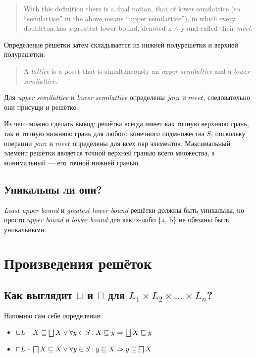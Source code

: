 \documentclass{report}
\begin{document}
\begin{quote}
    With this definition there is a dual notion, that of lower semilattice (so “semilattice” in the above means “upper semilattice”), in which every doubleton has a greatest lower bound, denoted x $\wedge$ y and called their \textit{meet}.
\end{quote}

Определение решётки затем складывается из нижней полурешётки и верхней полурешётки:

\begin{quote}
A \textit{lattice} is a poset that is simultaneously an \textit{upper semilattice} and a \textit{lower semilattice.}
\end{quote}

Для \textit{upper semilattice} и \textit{lower semilattice} определены \(join\) и \( meet\), следовательно они присущи и решётке.

Из чего можно сделать вывод: решётка всегда имеет как точную верхнюю грань, так и точную нижнюю грань для любого конечного подмножества $S$, поскольку операции \(join\) и \( meet\) определены для всех пар элементов. Максимальный элемент решётки является точной верхней гранью всего множества, а минимальный — его точной нижней гранью.

\subsection{Уникальны ли они?}

\textit{Least upper bound} и \textit{greatest lower bound} решётки должны быть уникальны, но просто \textit{upper bound} и \textit{lower bound} для каких-либо \{a, b\} не обязаны быть уникальными.

\section{Произведения решёток}

\subsection{Как выглядит $\sqcup$ и $\sqcap$ для $L_1 \times L_2 \times . . . \times L_n$?}

Напомню сам себе определения:
\begin{itemize}
    \item $\sqcup \space L$ -
        $X \sqsubseteq \bigsqcup X \space \vee \space \forall y \in S : X \sqsubseteq y \Rightarrow \bigsqcup X \sqsubseteq y$

    \item $\sqcap \space L$ -
        $ \bigsqcap X \sqsubseteq  X \space \vee \space \forall y \in S : y \sqsubseteq X \Rightarrow  y \sqsubseteq \bigsqcap X $
\end{itemize}
\end{document}
